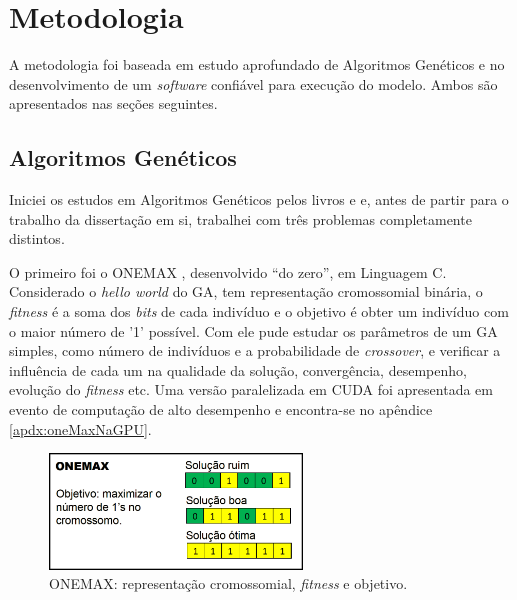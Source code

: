 \chapter{Metodologia\label{cap:metodologia}}
	
	A metodologia foi baseada em estudo aprofundado de Algoritmos Genéticos e no desenvolvimento de um \emph{software} confiável para execução do modelo. Ambos são apresentados
nas seções seguintes.

\section{Algoritmos Genéticos}\label{seq:medologia_ga}
	
	Iniciei os estudos em Algoritmos Genéticos pelos livros \cite{Mitchell98} e \cite{Linden2008} e, antes de partir para o trabalho da dissertação em si, trabalhei com três problemas completamente distintos.
	
	O primeiro foi o ONEMAX \cite{onemaxNaGPU}, desenvolvido ``do zero'', em Linguagem C. Considerado o \emph{hello world} do GA, tem representação cromossomial binária, o \emph{fitness} é a soma dos \emph{bits} de cada indivíduo e o objetivo é obter um indivíduo com o maior número de '1' possível. Com ele pude estudar os parâmetros de um GA simples, como número de indivíduos e a probabilidade de \emph{crossover}, e verificar a influência de cada um na qualidade da solução, convergência, desempenho, evolução do \emph{fitness} etc. Uma versão paralelizada em CUDA foi apresentada em evento de computação de alto desempenho \cite{ERAD12} e encontra-se no apêndice \ref{apdx:oneMaxNaGPU}.
	
	\begin{figure}[htbp]
		\centering
			\includegraphics[width=0.60\textwidth]{figs/resultados/onemax/onemax_objetivo.png}
		\caption{ONEMAX: representação cromossomial, \emph{fitness} e objetivo.}
		\label{fig:onemax_objetivo_metodologia}
	\end{figure}
	
